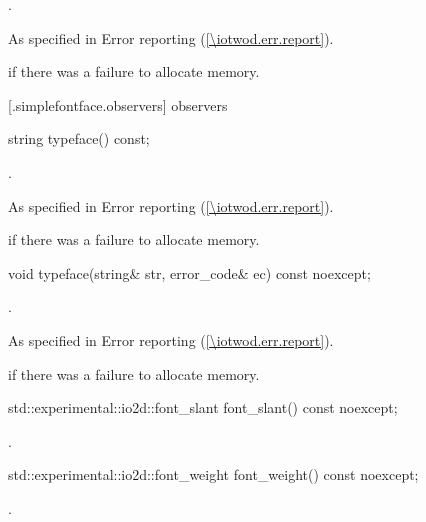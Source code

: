 \begin{itemdescr}
	\pnum
	.

	\pnum
	\throws
	As specified in Error reporting (\ref{\iotwod.err.report}).

	\pnum
	\errors
	 if there was a failure to allocate memory.
	
\end{itemdescr}

 [\iotwod.simplefontface.observers] { observers}

\begin{itemdecl}
    string typeface() const;
\end{itemdecl}
\begin{itemdescr}
	\pnum
	\returns
	.

	\pnum
	\throws
	As specified in Error reporting (\ref{\iotwod.err.report}).

	\pnum
	\errors
	 if there was a failure to allocate memory.
	
\end{itemdescr}

\begin{itemdecl}
    void typeface(string& str, error_code& ec) const noexcept;
\end{itemdecl}
\begin{itemdescr}
	\pnum
	\effects
	.

	\pnum
	\throws
	As specified in Error reporting (\ref{\iotwod.err.report}).

	\pnum
	\errors
	 if there was a failure to allocate memory.
	
\end{itemdescr}

\begin{itemdecl}
    std::experimental::io2d::font_slant font_slant() const noexcept;
\end{itemdecl}
\begin{itemdescr}
	\pnum
	\returns
	.
\end{itemdescr}

\begin{itemdecl}
    std::experimental::io2d::font_weight font_weight() const noexcept;
\end{itemdecl}
\begin{itemdescr}
	\pnum
	\returns
	.
\end{itemdescr}
